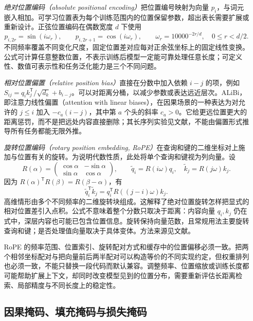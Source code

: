 \documentclass[UTF8,12pt,a4paper,fontset=fandol]{ctexart}
\begin{document}
\emph{绝对位置编码（absolute positional encoding）}把位置编号映射为向量 $p_i$，与词元嵌入相加。可学习位置表为每个训练范围内的位置保留参数，超出表长需要扩展或重新设计。正弦位置编码在偶数宽度 $d$ 下使用
\begin{equation}
p_{i,2r}=\sin(i\omega_r),\qquad
p_{i,2r+1}=\cos(i\omega_r),\qquad
\omega_r=10000^{-2r/d},\quad 0\le r<d/2.
\label{eq:tr-sinusoidal}
\end{equation}
不同频率覆盖不同变化尺度，固定位置差对应每对正余弦坐标上的固定线性变换。公式可计算任意整数位置，不表示训练后模型一定能可靠处理任意长度；可定义性、数值可表示性和任务泛化能力是三个不同问题。

\emph{相对位置偏置（relative position bias）}直接在分数中加入依赖 $i-j$ 的项，例如 $S_{ij}=q_i k_j^{\mathsf T}/\sqrt{d_k}+b_{i-j}$。可以对距离分桶，以减少参数或表达远近层次。ALiBi，即注意力线性偏置（attention with linear biases），在因果场景的一种表达为对允许的 $j\le i$ 加入 $-c_a(i-j)$，其中第 $a$ 个头的斜率 $c_a>0$。它给更远位置更大的距离惩罚，而不是把远处内容直接删除；其长序列实验见文献\cite{press2021}，不能由偏置形式推导所有任务都能无限外推。

\emph{旋转位置编码（rotary position embedding, RoPE）}在查询和键的二维坐标对上施加与位置有关的旋转。为说明代数性质，此处将单个查询和键视为列向量。设
\[
R(\alpha)=\begin{pmatrix}\cos\alpha&-\sin\alpha\\\sin\alpha&\cos\alpha\end{pmatrix},
\qquad \widetilde q_i=R(i\omega)q_i,\quad \widetilde k_j=R(j\omega)k_j.
\]
因为 $R(\alpha)^{\mathsf T}R(\beta)=R(\beta-\alpha)$，有
\begin{equation}
\widetilde q_i^{\mathsf T}\widetilde k_j
=q_i^{\mathsf T}R((j-i)\omega)k_j.
\label{eq:tr-rope}
\end{equation}
高维情形由多个不同频率的二维旋转块组成。这解释了绝对位置旋转怎样把显式的相对位置差引入点积。公式不意味着整个分数只取决于距离：内容向量 $q_i,k_j$ 仍在式中，深层内容也可能已包含位置信息。旋转保持向量范数，且常规用法主要旋转查询和键；是否处理值向量取决于具体变体。方法来源见文献\cite{su2021}。

RoPE 的频率范围、位置索引、旋转配对方式和缓存中的位置偏移必须一致。把两个相邻坐标配对与把向量前后两半配对可以构造等价的不同实现约定，但权重排列也必须一致，不能只替换一段代码而默认兼容。调整频率、位置缩放或训练长度都可能帮助扩展上下文，却同时改变模型见到的位置分布，需要重新评估长距离检索、局部精度与不同长度上的稳定性。

\subsection{因果掩码、填充掩码与损失掩码}
\end{document}
